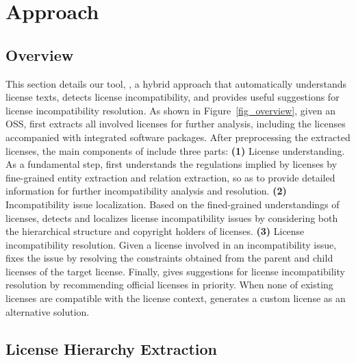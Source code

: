 \section{Approach}

\subsection{Overview}




This section details our tool, \tool, a hybrid approach that automatically understands license texts, detects license incompatibility, and provides useful suggestions for license incompatibility resolution.
 As shown in Figure~\ref{fig_overview}, given an OSS, \tool first extracts all involved licenses for further analysis, including the licenses accompanied with integrated software packages. After preprocessing the extracted licenses, the main components of \tool include three parts: \textbf{(1)} License understanding. As a fundamental step, \tool first understands the regulations implied by licenses by fine-grained entity extraction and relation extraction, so as to provide detailed information for further incompatibility analysis and resolution. \textbf{(2)} Incompatibility issue localization. Based on the fined-grained understandings of licenses, \tool detects and localizes license incompatibility issues by considering both the hierarchical structure and copyright holders of licenses. \textbf{(3)} License incompatibility resolution. Given a license involved in an incompatibility issue, \tool fixes the issue by resolving the constraints obtained from the parent and child licenses of the target license. Finally, \tool gives suggestions for license incompatibility resolution by recommending official licenses in priority. When none of existing licenses are compatible with the license context, \tool generates a custom license as an alternative solution.  

\subsection{{License Hierarchy Extraction}}\label{sec:hie}


